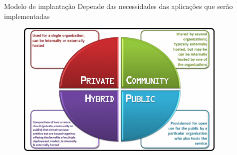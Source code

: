 \begin{frame}{Modelo de implantação}
    Depende das necessidades das aplicações que serão implementadas
    \begin{figure}
        \includegraphics[width=0.9\textwidth]{image/tiposModelos.png}
    \end{figure}
\end{frame}
